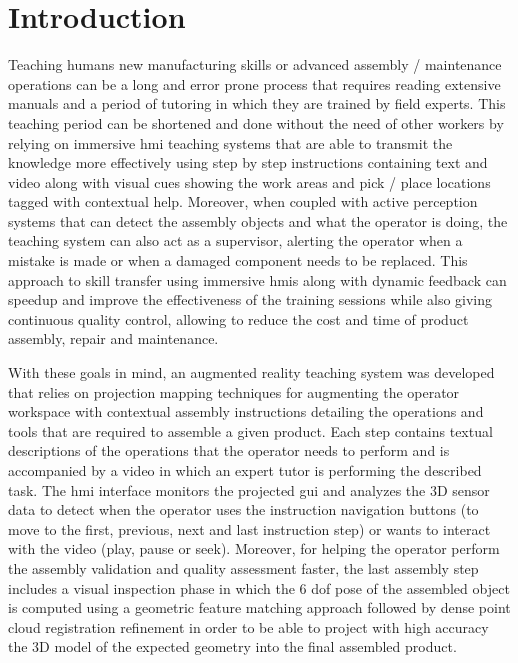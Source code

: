 \section{Introduction}\label{sec:introduction}

Teaching humans new manufacturing skills or advanced assembly / maintenance operations can be a long and error prone process that requires reading extensive manuals and a period of tutoring in which they are trained by field experts. This teaching period can be shortened and done without the need of other workers by relying on immersive \gls{hmi} teaching systems that are able to transmit the knowledge more effectively using step by step instructions containing text and video along with visual cues showing the work areas and pick / place locations tagged with contextual help. Moreover, when coupled with active perception systems that can detect the assembly objects and what the operator is doing, the teaching system can also act as a supervisor, alerting the operator when a mistake is made or when a damaged component needs to be replaced. This approach to skill transfer using immersive \glspl{hmi} along with dynamic feedback can speedup and improve the effectiveness of the training sessions while also giving continuous quality control, allowing to reduce the cost and time of product assembly, repair and maintenance.

With these goals in mind, an augmented reality teaching system was developed that relies on projection mapping techniques for augmenting the operator workspace with contextual assembly instructions detailing the operations and tools that are required to assemble a given product. Each step contains textual descriptions of the operations that the operator needs to perform and is accompanied by a video in which an expert tutor is performing the described task. The \gls{hmi} interface monitors the projected \gls{gui} and analyzes the 3D sensor data to detect when the operator uses the instruction navigation buttons (to move to the first, previous, next and last instruction step) or wants to interact with the video (play, pause or seek). Moreover, for helping the operator perform the assembly validation and quality assessment faster, the last assembly step includes a visual inspection phase in which the 6 \gls{dof} pose of the assembled object is computed using a geometric feature matching approach followed by dense point cloud registration refinement in order to be able to project with high accuracy the 3D model of the expected geometry into the final assembled product.

